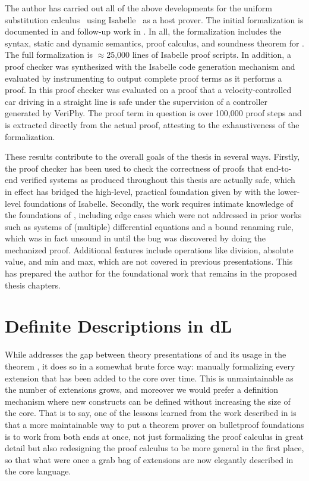 \documentclass[12pt]{cmuthesis}
\theoremstyle{definition}
\theoremstyle{remark}
\newcommand{\rref}[2][]{\prettyref{#2}}
\newcommand{\VeriPhy}{VeriPhy\xspace}
\begin{document}
The author has carried out all of the above developments for the \dL uniform substitution calculus~\cite{DBLP:journals/jar/Platzer17} using Isabelle~\cite{ISABELLE} as a host prover.
The initial formalization is documented in \cite{DBLP:conf/cpp/BohrerRVVP17} and follow-up work in \cite{DBLP:conf/pldi/BohrerTMMP18}.
In all, the formalization includes the syntax, static and dynamic semantics, proof calculus, and soundness theorem for \dL.
The full formalization is $\approx$25,000 lines of Isabelle proof scripts.
In addition, a proof checker was synthesized with the Isabelle code generation mechanism and evaluated by instrumenting \KeYmaeraX to output complete proof terms as it performs a proof.
In \cite{DBLP:conf/pldi/BohrerTMMP18} this proof checker was evaluated on a proof that a velocity-controlled car driving in a straight line is safe under the supervision of a controller generated by \VeriPhy.
The proof term in question is over 100,000 proof steps and is extracted directly from the actual \KeYmaeraX proof, attesting to the exhaustiveness of the formalization.

These results contribute to the overall goals of the thesis in several ways.
Firstly, the proof checker has been used to check the correctness of \dL proofs that end-to-end verified systems as produced throughout this thesis are actually safe, which in effect has bridged the high-level, practical foundation given by \dL with the lower-level foundations of Isabelle.
Secondly, the work requires intimate knowledge of the foundations of \dL, including edge cases which were not addressed in prior works such as systems of (multiple) differential equations and a bound renaming rule, which was in fact unsound in \KeYmaeraX until the bug was discovered by doing the mechanized proof.
Additional features include operations like division, absolute value, and min and max, which are not covered in previous presentations.
This has prepared the author for the foundational work that remains in the proposed thesis chapters.

\section{Definite Descriptions in dL}
\label{sec:definite-description}
While \rref{sec:isabelle-fml} addresses the gap between theory presentations of \dL and its usage in the theorem \KeYmaeraX, it does so in a somewhat brute force way: manually formalizing every extension that has been added to the \KeYmaeraX core over time.
This is unmaintainable as the number of extensions grows, and moreover we would prefer a definition mechanism where new constructs can be defined without increasing the size of the core.
That is to say, one of the lessons learned from the work described in \rref{sec:isabelle-fml} is that a more maintainable way to put a theorem prover on bulletproof foundations is to work from both ends at once, not just formalizing the proof calculus in great detail but also redesigning the proof calculus to be more general in the first place, so that what were once a grab bag of extensions are now elegantly described in the core language.
\end{document}
